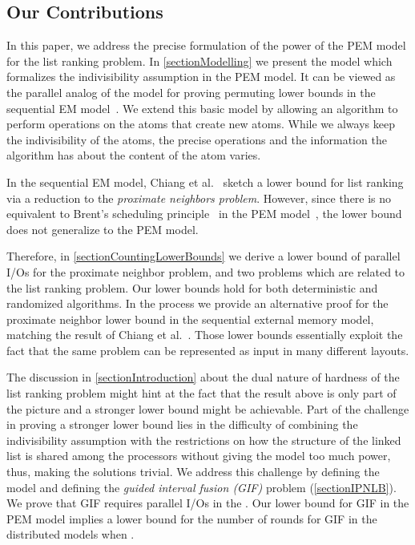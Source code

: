 \documentclass[envcountsame]{llncs}
\begin{document}
\subsection{Our Contributions}
\label{sectionContributions}


In this paper, we address the precise formulation of the power of the PEM model for the list ranking problem.
In \autoref{sectionModelling} we present the \movePEM model which formalizes the indivisibility assumption in the PEM model.
It can be viewed as the parallel analog of the model for proving permuting lower bounds in the sequential EM model~\cite{1988AggarwalVitterEM}. 
We extend this basic model by allowing an algorithm to perform operations on the atoms that create new atoms. 
While we always keep the indivisibility of the atoms, the precise operations and the information the algorithm has about the content of the atom varies.


In the sequential EM model, Chiang et al.~\cite{1995ChiangExternalMemoryGraphAlgorithms} sketch a lower bound for list ranking via a reduction to the {\em proximate neighbors problem}.
However, since there is no equivalent to Brent's scheduling principle~\cite{1984VishkinRandomizedLR} in the PEM model~\cite{2012ThesisGero}, the lower bound does not generalize to the PEM model.

Therefore, in \autoref{sectionCountingLowerBounds} we derive a lower bound of  parallel I/Os for the proximate neighbor problem, and two problems which are related to the list ranking problem. Our lower bounds hold for both deterministic and randomized algorithms.
In the process we provide an alternative proof for the proximate neighbor lower bound in the sequential external memory model, matching the result of Chiang et al.~\cite{1995ChiangExternalMemoryGraphAlgorithms}.
Those lower bounds essentially exploit the fact that the same problem can be represented as input in many different layouts.



The discussion in \autoref{sectionIntroduction} about the dual nature of hardness of the list ranking problem might hint at the fact that the result above is only part of the picture and a stronger lower bound might be achievable. 
Part of the challenge in proving a stronger lower bound lies in the difficulty of combining the indivisibility assumption with the restrictions on how the structure of the linked list is shared among the processors without giving the model too much power, thus, making the solutions trivial. 
We address this challenge by defining the \emph{\fusePEM} model and defining the {\em guided interval fusion (GIF)} problem (\autoref{sectionIPNLB}).
We prove that GIF requires  parallel I/Os in the \fusePEM. Our lower bound for GIF in the PEM model implies a  lower bound for the number of rounds for GIF in the distributed models when . 
\end{document}
